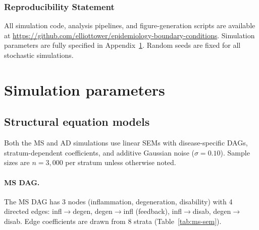 \documentclass[11pt]{article}
\begin{document}
\subsubsection*{Reproducibility Statement}
All simulation code, analysis pipelines, and figure-generation scripts are available at \url{https://github.com/elliottower/epidemiology-boundary-conditions}. Simulation parameters are fully specified in Appendix~\ref{app:sim-params}. Random seeds are fixed for all stochastic simulations.




\appendix

\section{Simulation parameters}
\label{app:sim-params}

\subsection{Structural equation models}

Both the MS and AD simulations use linear SEMs with disease-specific DAGs, stratum-dependent coefficients, and additive Gaussian noise ($\sigma = 0.10$). Sample sizes are $n = 3{,}000$ per stratum unless otherwise noted.

\paragraph{MS DAG.}
The MS DAG has 3 nodes (inflammation, degeneration, disability) with 4 directed edges: infl$\to$degen, degen$\to$infl (feedback), infl$\to$disab, degen$\to$disab. Edge coefficients are drawn from 8 strata (Table~\ref{tab:ms-sem}).
\end{document}
